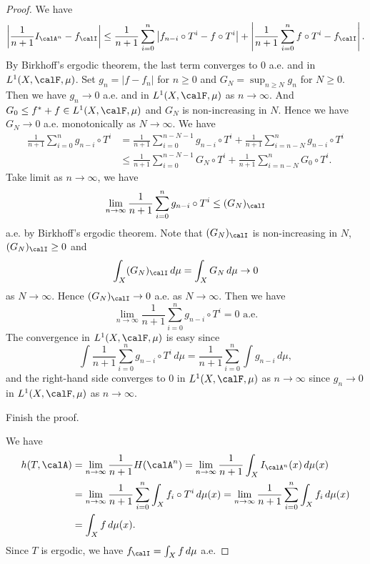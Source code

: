 \begin{proof}
    We have
    \[ \left| \frac{1}{n+1} I_{\calA^n} - f_\calI\right| \leq \frac{1}{n+1} \sum_{i=0}^{n} \left|f_{n-i} \circ T^i - f \circ T^i\right| + \left|\frac{1}{n+1} \sum_{i=0}^{n} f \circ T^i - f_\calI\right|. \]
    By Birkhoff's ergodic theorem, the last term converges to $0$ a.e. and in $L^1(X, \calF, \mu)$.
    Set $g_n = |f-f_n|$ for $n \geq 0$ and $G_N = \sup_{n \geq N} g_n$ for $N \geq 0$.
    Then we have $g_n \to 0$ a.e. and in $L^1(X, \calF, \mu)$ as $n \to \infty$.
    And $G_0 \leq f^* + f \in L^1(X, \calF, \mu)$ and $G_N$ is non-increasing in $N$.
    Hence we have $G_N \to 0$ a.e. monotonically as $N \to \infty$.
    We have 
    \begin{align*}
      \frac{1}{n+1} \sum_{i=0}^{n} g_{n-i} \circ T^i & = \frac{1}{n+1} \sum_{i=0}^{n - N-1} g_{n-i} \circ T^i + \frac{1}{n+1} \sum_{i=n-N}^{n} g_{n-i} \circ T^i \\
      & \leq \frac{1}{n+1} \sum_{i=0}^{n - N-1} G_N \circ T^i + \frac{1}{n+1} \sum_{i=n-N}^{n} G_0 \circ T^i.
    \end{align*}
    Take limit as $n \to \infty$, we have
    \[ \lim_{n \to \infty} \frac{1}{n+1} \sum_{i=0}^{n} g_{n-i} \circ T^i \leq (G_N)_\calI \]
    a.e. by Birkhoff's ergodic theorem.
    Note that $(G_N)_\calI$ is non-increasing in $N$, $(G_N)_\calI \geq 0$ and 
    \[ \int_X (G_N)_\calI \, d\mu = \int_X G_N \, d\mu \to 0 \]
    as $N \to \infty$.
    Hence $(G_N)_\calI \to 0$ a.e. as $N \to \infty$.
    Then we have 
    \[ \lim_{n \to \infty} \frac{1}{n+1} \sum_{i=0}^{n} g_{n-i} \circ T^i = 0 \text{ a.e.} \]
    The convergence in $L^1(X, \calF, \mu)$ is easy since 
    \[ \int \frac{1}{n+1} \sum_{i=0}^{n} g_{n-i} \circ T^i \, d\mu = \frac{1}{n+1} \sum_{i=0}^{n} \int g_{n-i} \, d\mu, \]
    and the right-hand side converges to $0$ in $L^1(X, \calF, \mu)$ as $n \to \infty$ since $g_n \to 0$ in $L^1(X, \calF, \mu)$ as $n \to \infty$.



    \begin{step}
      Finish the proof.
    \end{step}
    We have 
    \begin{align*}
      h(T, \calA) & = \lim_{n \to \infty} \frac{1}{n+1} H(\calA^n) = \lim_{n \to \infty} \frac{1}{n+1} \int_X I_{\calA^n}(x) \, d\mu(x) \\
      & = \lim_{n \to \infty} \frac{1}{n+1} \sum_{i=0}^{n} \int_X f_i \circ T^i \, d\mu(x) = \lim_{n \to \infty} \frac{1}{n+1} \sum_{i=0}^{n} \int_X f_i \, d\mu(x)\\
      & = \int_X f \, d\mu(x).
    \end{align*}
    Since $T$ is ergodic, we have $f_\calI = \int_X f \, d\mu$ a.e.
  \end{proof}

